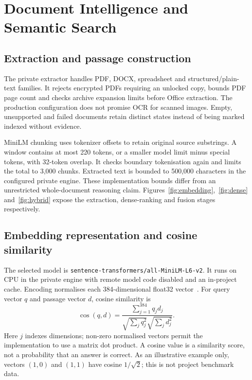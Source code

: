 \chapter{Document Intelligence and Semantic Search}
\section{Extraction and passage construction}
The private extractor handles PDF, DOCX, spreadsheet and structured/plain-text families. It rejects encrypted PDFs requiring an unlocked copy, bounds PDF page count and checks archive expansion limits before Office extraction. The production configuration does not promise OCR for scanned images. Empty, unsupported and failed documents retain distinct states instead of being marked indexed without evidence.

MiniLM chunking uses tokenizer offsets to retain original source substrings. A window contains at most 220 tokens, or a smaller model limit minus special tokens, with 32-token overlap. It checks boundary tokenisation again and limits the total to 3,000 chunks. Extracted text is bounded to 500,000 characters in the configured private engine. These implementation bounds differ from an unrestricted whole-document reasoning claim.
Figures~\ref{fig:embedding},~\ref{fig:dense} and~\ref{fig:hybrid} expose the extraction, dense-ranking and fusion stages respectively.
\section{Embedding representation and cosine similarity}
The selected model is \texttt{sentence-transformers/all-MiniLM-L6-v2}. It runs on CPU in the private engine with remote model code disabled and an in-project cache. Encoding normalises each 384-dimensional float32 vector~\cite{minilmcard}. For query vector $q$ and passage vector $d$, cosine similarity is
\begin{equation}\operatorname{cos}(q,d)=\frac{\sum_{j=1}^{384}q_jd_j}{\sqrt{\sum_jq_j^2}\sqrt{\sum_jd_j^2}}.\end{equation}
Here $j$ indexes dimensions; non-zero normalised vectors permit the implementation to use a matrix dot product. A cosine value is a similarity score, not a probability that an answer is correct. As an illustrative example only, vectors $(1,0)$ and $(1,1)$ have cosine $1/\sqrt{2}$; this is not project benchmark data.
